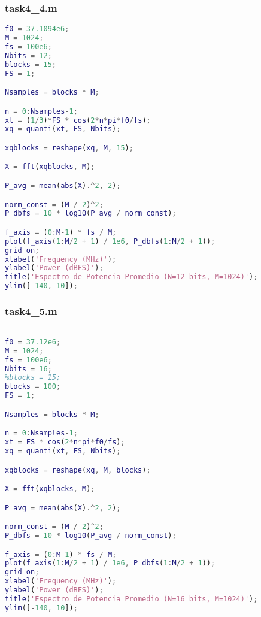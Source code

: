 \subsubsection{task4\_4.m}
\begin{lstlisting}[language=Matlab]
f0 = 37.1094e6;
M = 1024;
fs = 100e6;
Nbits = 12;
blocks = 15;
FS = 1;

Nsamples = blocks * M;

n = 0:Nsamples-1;
xt = (1/3)*FS * cos(2*n*pi*f0/fs);
xq = quanti(xt, FS, Nbits);

xqblocks = reshape(xq, M, 15);

X = fft(xqblocks, M);

P_avg = mean(abs(X).^2, 2);

norm_const = (M / 2)^2;
P_dbfs = 10 * log10(P_avg / norm_const);

f_axis = (0:M-1) * fs / M; 
plot(f_axis(1:M/2 + 1) / 1e6, P_dbfs(1:M/2 + 1));
grid on;
xlabel('Frequency (MHz)');
ylabel('Power (dBFS)');
title('Espectro de Potencia Promedio (N=12 bits, M=1024)');
ylim([-140, 10]);
\end{lstlisting}

\subsubsection{task4\_5.m}
\begin{lstlisting}[language=Matlab]

f0 = 37.12e6;
M = 1024;
fs = 100e6;
Nbits = 16;
%blocks = 15;
blocks = 100;
FS = 1;

Nsamples = blocks * M;

n = 0:Nsamples-1;
xt = FS * cos(2*n*pi*f0/fs);
xq = quanti(xt, FS, Nbits);

xqblocks = reshape(xq, M, blocks);

X = fft(xqblocks, M);

P_avg = mean(abs(X).^2, 2);

norm_const = (M / 2)^2;
P_dbfs = 10 * log10(P_avg / norm_const);

f_axis = (0:M-1) * fs / M;
plot(f_axis(1:M/2 + 1) / 1e6, P_dbfs(1:M/2 + 1));
grid on;
xlabel('Frequency (MHz)');
ylabel('Power (dBFS)');
title('Espectro de Potencia Promedio (N=16 bits, M=1024)');
ylim([-140, 10]);
\end{lstlisting}
